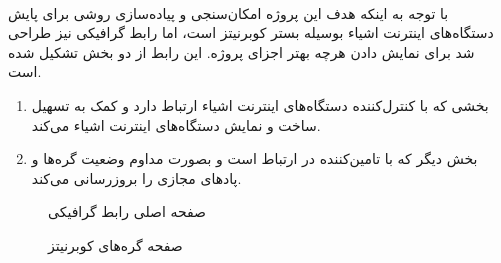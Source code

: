 \paragraph{}
{
    با توجه به اینکه هدف این پروژه امکان‌سنجی و پیاده‌سازی روشی برای پایش دستگاه‌های اینترنت اشیاء بوسیله بستر کوبرنیتز است، اما رابط گرافیکی نیز طراحی شد برای
    نمایش دادن هرچه بهتر اجزای پروژه. این رابط از دو بخش تشکیل شده است.
    \begin{enumerate}
        \item بخشی که با کنترل‌کننده دستگاه‌های اینترنت اشیاء ارتباط دارد و کمک به تسهیل ساخت و نمایش دستگاه‌‌های اینترنت اشیاء می‌کند.
        \item بخش دیگر که با تامین‌کننده در ارتباط است و بصورت مداوم وضعیت گره‌ها و پاد‌های مجازی را بروزرسانی می‌کند.
    \end{enumerate}

    \begin{figure}[H]
        \caption{صفحه اصلی رابط گرافیکی}
        \label{fig:dash_home}
    \end{figure}

    \begin{figure}[H]
        \caption{صفحه گره‌های کوبرنیتز}
        \label{fig:dash_nodes}
    \end{figure}

}
